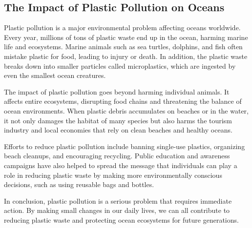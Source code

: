 \documentclass[12pt]{article}
\begin{document}
\onehalfspacing

\subsection*{The Impact of Plastic Pollution on Oceans}
\begin{tcolorbox}[colframe=black!40, colback=gray!5]
\begin{spacing}{1.15}
    Plastic pollution is a major environmental problem affecting oceans worldwide. Every year, millions of tons of plastic waste end up in the ocean, harming marine life and ecosystems. Marine animals such as sea turtles, dolphins, and fish often mistake plastic for food, leading to injury or death. In addition, the plastic waste breaks down into smaller particles called microplastics, which are ingested by even the smallest ocean creatures.

    The impact of plastic pollution goes beyond harming individual animals. It affects entire ecosystems, disrupting food chains and threatening the balance of ocean environments. When plastic debris accumulates on beaches or in the water, it not only damages the habitat of many species but also harms the tourism industry and local economies that rely on clean beaches and healthy oceans.

    Efforts to reduce plastic pollution include banning single-use plastics, organizing beach cleanups, and encouraging recycling. Public education and awareness campaigns have also helped to spread the message that individuals can play a role in reducing plastic waste by making more environmentally conscious decisions, such as using reusable bags and bottles.

    In conclusion, plastic pollution is a serious problem that requires immediate action. By making small changes in our daily lives, we can all contribute to reducing plastic waste and protecting ocean ecosystems for future generations.
\end{spacing}
\end{tcolorbox}

\end{document}
